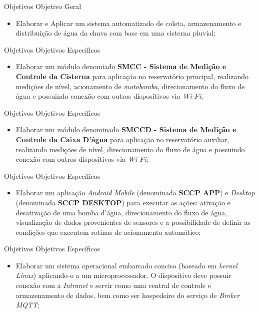 \begin{frame}{Objetivos}
	{Objetivo Geral}
		\begin{itemize}
		\item Elaborar e Aplicar um sistema automatizado de coleta, armazenamento e distribuição de água da chuva com base em uma cisterna pluvial;
	\end{itemize}
\end{frame}

\begin{frame}{Objetivos}
	{Objetivos Específicos}
	\begin{itemize}
		\item Elaborar um módulo denomiado \textbf{SMCC - Sistema de Medição e Controle da Cisterna} para aplicação no reservatório principal, realizando medições de nível, acionamento de \textit{motobomba}, direcionamento do fluxo de água e possuindo conexão com outros dispositivos via \textit{ Wi-Fi};
	\end{itemize}
\end{frame}

\begin{frame}{Objetivos}
	{Objetivos Específicos}
	\begin{itemize}
		\item Elaborar um módulo denominado \textbf{SMCCD - Sistema de Medição e Controle da Caixa D'água} para aplicação no reservatório auxiliar, realizando medições de nível, direcionamento do fluxo de água e possuindo conexão com outros dispositivos via \textit{Wi-Fi};
	\end{itemize}
\end{frame}

\begin{frame}{Objetivos}
	{Objetivos Específicos}
	\begin{itemize}
		\item Elaborar um aplicação \textit{Android Mobile} (denominada \textbf{SCCP APP}) e \textit{Desktop} (denominada \textbf{SCCP DESKTOP}) para executar as ações: ativação e desativação de uma bomba d'água, direcionamento do fluxo de água, visualização de dados provenientes de sensores e a possibilidade de definir as condições que executem rotinas de acionamento automático;
	\end{itemize}
\end{frame}

\begin{frame}{Objetivos}
	{Objetivos Específicos}
	\begin{itemize}
		\item Elaborar um sistema operacional embarcado conciso (baseado em \textit{kernel Linux}) aplicando-o a um microprocessador. O dispositivo deve possuir conexão com a \textit{Intranet} e servir como uma central de controle e armazenamento de dados, bem como ser hospedeiro do serviço de \textit{Broker MQTT};
	\end{itemize}
\end{frame}

